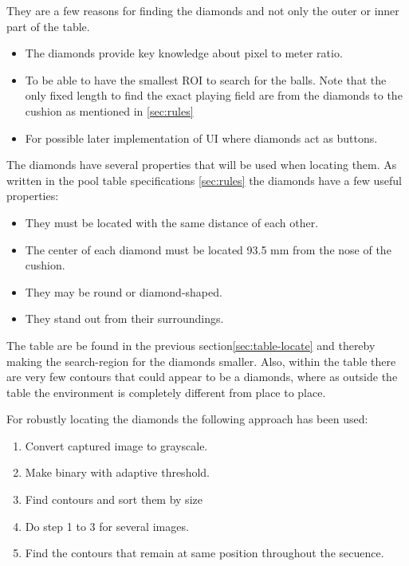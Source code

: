 They are a few reasons for finding the diamonds and not only the outer or inner part of the table.

\begin{itemize}
	\item The diamonds provide key knowledge about pixel to meter ratio.
	\item To be able to have the smallest ROI to search for the balls. Note that the only fixed length to find the exact playing field are from the diamonds to the cushion as mentioned in \ref{sec:rules}
	\item For possible later implementation of UI where diamonds act as buttons.
\end{itemize}

The diamonds have several properties that will be used when locating them. As written in the pool table specifications \ref{sec:rules} the diamonds have a few useful properties:

\begin{itemize}
	\item They must be located with the same distance of each other.
	\item The center of each diamond must be located 93.5 mm from the nose of the cushion.
	\item They may be round or diamond-shaped.
	\item They stand out from their surroundings.
\end{itemize}

The table are be found in the previous section\ref{sec:table-locate} and thereby making the search-region for the diamonds smaller. Also, within the table there are very few contours that could appear to be a diamonds, where as outside the table the environment is completely different from place to place.

For robustly locating the diamonds the following approach has been used:
\begin{enumerate}
	\item Convert captured image to grayscale.
	\item Make binary with adaptive threshold.
	\item Find contours and sort them by size
	\item Do step 1 to 3 for several images.
	\item Find the contours that remain at same position throughout the secuence.
\end{enumerate}


